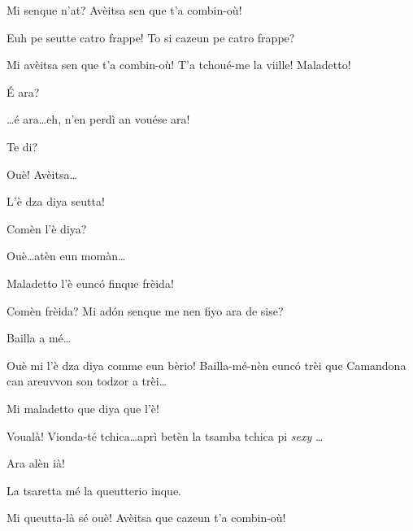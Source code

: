 \begin{drama}
\Cimaspeaks Mi senque n'at? Avèitsa sen que t'a combin-où!

\Marcospeaks Euh pe seutte catro frappe! To si cazeun pe catro frappe?

\Cimaspeaks Mi avèitsa  sen que t'a combin-où! T'a tchoué-me la viille! Maladetto!

\Marcospeaks \'E ara?

\Cimaspeaks  \ldots é ara\ldots eh, n'en perdì an vouése ara!

\Marcospeaks Te di?

\Cimaspeaks Ouè! Avèitsa\ldots


\Cimaspeaks L'è dza diya seutta!

\Marcospeaks Comèn l'è diya?

\Cimaspeaks Ouè\ldots atèn eun momàn\ldots


\Cimaspeaks Maladetto l'è eunc\'o finque frèida!

\Marcospeaks {} Comèn frèida?  Mi ad\'on senque me nen fiyo ara de sise? 

\Cimaspeaks Bailla a mé\ldots


\Cimaspeaks Ouè mi l'è dza diya comme eun bèrio!  Bailla-mé-nèn eunc\'o trèi que Camandona can areuvvon son todzor a trèi\ldots


\Cimaspeaks Mi maladetto que diya que l'è!

\Cimaspeaks {} Voualà! Vionda-té tchica\ldots aprì betèn la tsamba tchica pi \textit{sexy} \ldots 


\Cimaspeaks Ara alèn ià!

\Marcospeaks La tsaretta mé la queutterio inque.

\Cimaspeaks Mi queutta-là sé ouè! Avèitsa que cazeun t'a combin-où!


\end{drama}
